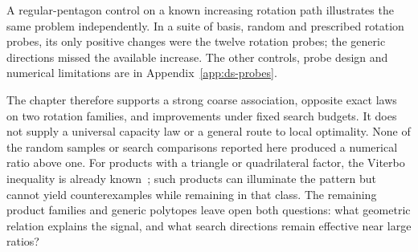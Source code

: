 A regular-pentagon control on a known increasing rotation path illustrates
the same problem independently. In a suite of basis, random and prescribed
rotation probes, its only positive changes were the twelve rotation
probes; the generic directions missed the available increase. The other
controls, probe design and numerical limitations are in
Appendix~\ref{app:ds-probes}.

The chapter therefore supports a strong coarse association, opposite
exact laws on two rotation families, and improvements under fixed search budgets. It does
not supply a universal capacity law or a general route to local optimality.
None of the random samples or search comparisons reported here produced a numerical
ratio above one. For products with a triangle or quadrilateral factor,
the Viterbo inequality is already known~\cite[Theorem~1.2 and Section~4]{dsBMP2026};
such products can illuminate the pattern but cannot yield counterexamples
while remaining in that class. The remaining product families and generic
polytopes leave open both questions: what geometric relation explains the
signal, and what search directions remain effective near large ratios?
